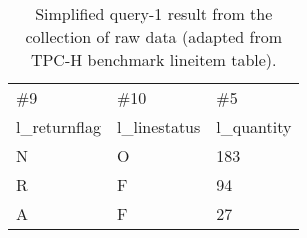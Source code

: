 \begin{table}[H]
\caption{Simplified query-1 result from the collection of raw data (adapted from TPC-H benchmark lineitem table). }
\label{table:results_simple_query_1}
\scriptsize
\centering
\begin{tabular}{ |  L{1.5cm} |  L{1.5cm}  |  L{1.5cm}  |    } 
\hline
\#9	&	\#10		 & \#5	  \\ 
l\_returnflag	&	l\_linestatus	&	 l\_quantity 	  \\ \hline
\hline
N	&	O	&	183	  \\ \hline
R	&	F	&	94	  \\ \hline
A	&	F	&	27	  \\ \hline
\end{tabular}

\end{table}
